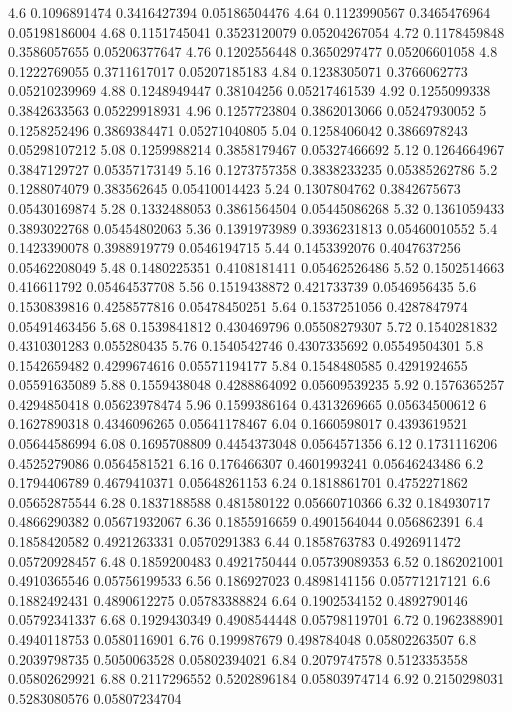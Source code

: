 {4.6 0.1096891474 0.3416427394 0.05186504476
4.64 0.1123990567 0.3465476964 0.05198186004
4.68 0.1151745041 0.3523120079 0.05204267054
4.72 0.1178459848 0.3586057655 0.05206377647
4.76 0.1202556448 0.3650297477 0.05206601058
4.8 0.1222769055 0.3711617017 0.05207185183
4.84 0.1238305071 0.3766062773 0.05210239969
4.88 0.1248949447 0.38104256 0.05217461539
4.92 0.1255099338 0.3842633563 0.05229918931
4.96 0.1257723804 0.3862013066 0.05247930052
5 0.1258252496 0.3869384471 0.05271040805
5.04 0.1258406042 0.3866978243 0.05298107212
5.08 0.1259988214 0.3858179467 0.05327466692
5.12 0.1264664967 0.3847129727 0.05357173149
5.16 0.1273757358 0.3838233235 0.05385262786
5.2 0.1288074079 0.383562645 0.05410014423
5.24 0.1307804762 0.3842675673 0.05430169874
5.28 0.1332488053 0.3861564504 0.05445086268
5.32 0.1361059433 0.3893022768 0.05454802063
5.36 0.1391973989 0.3936231813 0.05460010552
5.4 0.1423390078 0.3988919779 0.0546194715
5.44 0.1453392076 0.4047637256 0.05462208049
5.48 0.1480225351 0.4108181411 0.05462526486
5.52 0.1502514663 0.416611792 0.05464537708
5.56 0.1519438872 0.421733739 0.0546956435
5.6 0.1530839816 0.4258577816 0.05478450251
5.64 0.1537251056 0.4287847974 0.05491463456
5.68 0.1539841812 0.430469796 0.05508279307
5.72 0.1540281832 0.4310301283 0.055280435
5.76 0.1540542746 0.4307335692 0.05549504301
5.8 0.1542659482 0.4299674616 0.05571194177
5.84 0.1548480585 0.4291924655 0.05591635089
5.88 0.1559438048 0.4288864092 0.05609539235
5.92 0.1576365257 0.4294850418 0.05623978474
5.96 0.1599386164 0.4313269665 0.05634500612
6 0.1627890318 0.4346096265 0.05641178467
6.04 0.1660598017 0.4393619521 0.05644586994
6.08 0.1695708809 0.4454373048 0.0564571356
6.12 0.1731116206 0.4525279086 0.0564581521
6.16 0.176466307 0.4601993241 0.05646243486
6.2 0.1794406789 0.4679410371 0.05648261153
6.24 0.1818861701 0.4752271862 0.05652875544
6.28 0.1837188588 0.481580122 0.05660710366
6.32 0.184930717 0.4866290382 0.05671932067
6.36 0.1855916659 0.4901564044 0.056862391
6.4 0.1858420582 0.4921263331 0.0570291383
6.44 0.1858763783 0.4926911472 0.05720928457
6.48 0.1859200483 0.4921750444 0.05739089353
6.52 0.1862021001 0.4910365546 0.05756199533
6.56 0.186927023 0.4898141156 0.05771217121
6.6 0.1882492431 0.4890612275 0.05783388824
6.64 0.1902534152 0.4892790146 0.05792341337
6.68 0.1929430349 0.4908544448 0.05798119701
6.72 0.1962388901 0.4940118753 0.0580116901
6.76 0.199987679 0.498784048 0.05802263507
6.8 0.2039798735 0.5050063528 0.05802394021
6.84 0.2079747578 0.5123353558 0.05802629921
6.88 0.2117296552 0.5202896184 0.05803974714
6.92 0.2150298031 0.5283080576 0.05807234704
}
